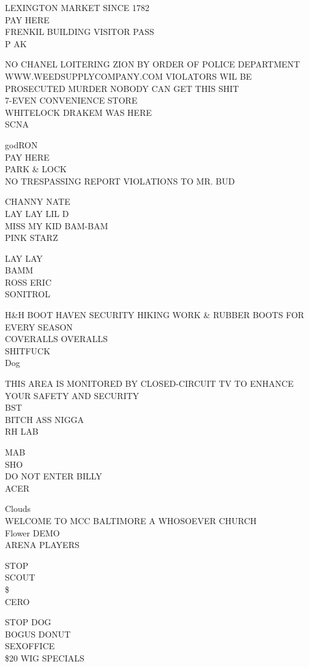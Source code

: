 \documentclass[10pt,letterpaper]{article}
\begin{document}
LEXINGTON MARKET SINCE 1782\\
PAY HERE\\
FRENKIL BUILDING VISITOR PASS\\
P AK

NO CHANEL LOITERING ZION BY ORDER OF POLICE DEPARTMENT WWW.WEEDSUPPLYCOMPANY.COM VIOLATORS WIL BE PROSECUTED MURDER NOBODY CAN GET THIS SHIT\\
7{-}EVEN CONVENIENCE STORE\\
WHITELOCK DRAKEM WAS HERE\\
SCNA

godRON\\
PAY HERE\\
PARK \& LOCK\\
NO TRESPASSING REPORT VIOLATIONS TO MR. BUD

CHANNY NATE\\
LAY LAY LIL D\\
MISS MY KID BAM{-}BAM\\
PINK STARZ

LAY LAY\\
BAMM\\
ROSS ERIC\\
SONITROL

H\&H BOOT HAVEN SECURITY HIKING WORK \& RUBBER BOOTS FOR EVERY SEASON\\
COVERALLS OVERALLS\\
SHITFUCK\\
Dog

THIS AREA IS MONITORED BY CLOSED{-}CIRCUIT TV TO ENHANCE YOUR SAFETY AND SECURITY\\
BST\\
BITCH ASS NIGGA\\
RH LAB

MAB\\
SHO\\
DO NOT ENTER BILLY\\
ACER

Clouds\\
WELCOME TO MCC BALTIMORE A WHOSOEVER CHURCH\\
Flower DEMO\\
ARENA PLAYERS

STOP\\
SCOUT\\
\$\\
CERO

STOP DOG\\
BOGUS DONUT\\
SEXOFFICE\\
\$20 WIG SPECIALS
\end{document}
